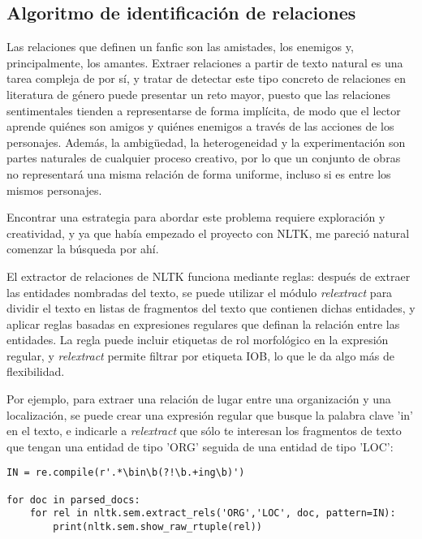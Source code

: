 \documentclass{pre-tfg}
\begin{document}


\subsection{Algoritmo de identificación de relaciones}

Las relaciones que definen un fanfic son las amistades, los enemigos y, principalmente, los amantes. Extraer relaciones a partir de texto natural es una tarea compleja de por sí, y tratar de detectar este tipo concreto de relaciones en literatura de género puede presentar un reto mayor, puesto que las relaciones sentimentales tienden a representarse de forma implícita, de modo que el lector aprende quiénes son amigos y quiénes enemigos a través de las acciones de los personajes. Además, la ambigüedad, la heterogeneidad y la experimentación son partes naturales de cualquier proceso creativo, por lo que un conjunto de obras no representará una misma relación de forma uniforme, incluso si es entre los mismos personajes.

Encontrar una estrategia para abordar este problema requiere exploración y creatividad, y ya que había empezado el proyecto con NLTK, me pareció natural comenzar la búsqueda por ahí.

El extractor de relaciones de NLTK funciona mediante reglas: después de extraer las entidades nombradas del texto, se puede utilizar el módulo \textit{relextract} para dividir el texto en listas de fragmentos del texto que contienen dichas entidades, y aplicar reglas basadas en expresiones regulares que definan la relación entre las entidades. La regla puede incluir etiquetas de rol morfológico en la expresión regular, y \textit{relextract} permite filtrar por etiqueta IOB, lo que le da algo más de flexibilidad.

Por ejemplo, para extraer una relación de lugar entre una organización y una localización, se puede crear una expresión regular que busque la palabra clave 'in' en el texto, e indicarle a \textit{relextract} que sólo te interesan los fragmentos de texto que tengan una entidad de tipo 'ORG' seguida de una entidad de tipo 'LOC':
\begin{lstlisting}[style=consola, caption=Ejemplo de código que utiliza el módulo \textit{regexp} de NLTK para extraer relaciones de lugar y mostrarlas por pantalla. Adaptado del capítulo 7 de Natural Language Processing with Python\cite{bird_2012}]
IN = re.compile(r'.*\bin\b(?!\b.+ing\b)')

for doc in parsed_docs:
	for rel in nltk.sem.extract_rels('ORG','LOC', doc, pattern=IN):
		print(nltk.sem.show_raw_rtuple(rel))

\end{lstlisting}
\end{document}
